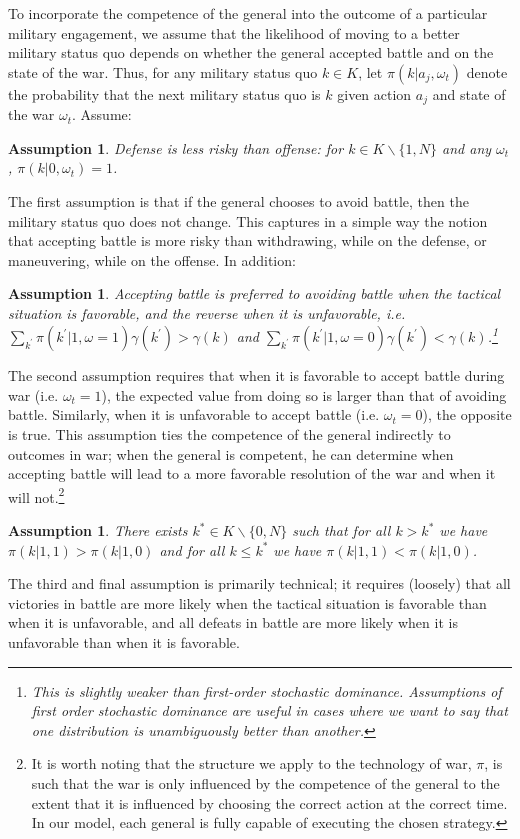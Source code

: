 \documentclass[11pt,]{article}
\newtheorem{assumption}[]{Assumption}
\begin{document}
To incorporate the competence of the general into the outcome of a particular military engagement, we assume that the likelihood of moving to a better military status quo depends on whether the general accepted battle and on the state of the war.  Thus, for any military status quo $k\in K$, let $\pi(k|a_j,\omega_t)$ denote the probability that the next military status quo is $k$ given action $a_j$ and state of the war $\omega_t$.  Assume:
\begin{assumption}Defense is less risky than offense: for $k\in K\backslash\{1,N\}$ and any $\omega_t$, $\pi(k|0,\omega_t)=1$.\label{defense}
\end{assumption}\noindent The first assumption is that if the general chooses to avoid battle, then the military status quo does not change.  This captures in a simple way the notion that accepting battle is more risky than withdrawing, while on the defense, or maneuvering, while on the offense. In addition:
\begin{assumption}Accepting battle is preferred to avoiding battle when the tactical situation is favorable, and the reverse when it is unfavorable, i.e. $\sum_{k^{\prime}}\pi(k^{\prime}|1,\omega=1)\gamma(k^{\prime})>\gamma(k)$ and $\sum_{k^{\prime}}\pi(k^{\prime}|1,\omega=0)\gamma(k^{\prime})<\gamma(k)$.\label{FOSD}\footnote{\normalsize\doublespacing This is slightly weaker than first-order stochastic dominance.  Assumptions of first order stochastic dominance are useful in cases where we want to say that one distribution is unambiguously better than another.}
\end{assumption}\noindent The second assumption requires that when it is favorable to accept battle during war (i.e. $\omega_t=1$), the expected value from doing so is larger than that of avoiding battle.  Similarly, when it is unfavorable to accept battle (i.e. $\omega_t=0$), the opposite is true.  This assumption ties the competence of the general indirectly to outcomes in war; when the general is competent, he can determine when accepting battle will lead to a more favorable resolution of the war and when it will not.\footnote{\normalsize\doublespacing It is worth noting that the structure we apply to the technology of war, $\pi$, is such that the war is only influenced by the competence of the general to the extent that it is influenced by choosing the correct action at the correct time.  In our model, each general is fully capable of executing the chosen strategy.}
\begin{assumption}There exists $k^*\in K\backslash\{0,N\}$ such that for all $k>k^*$ we have $\pi(k|1,1)>\pi(k|1,0)$ and for all $k\leq k^*$ we have $\pi(k|1,1)<\pi(k|1,0)$.\label{distributions}
\end{assumption}\noindent The third and final assumption is primarily technical; it requires (loosely) that all victories in battle are more likely when the tactical situation is favorable than when it is unfavorable, and all defeats in battle are more likely when it is unfavorable than when it is favorable.
\end{document}

